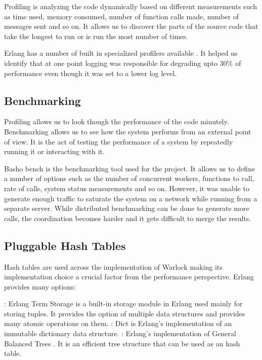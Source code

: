 Profiling is analyzing the code dynamically based on different measurements such
as  time used, memory consumed, number of function calls made,
number of messages
sent and so on. It allows us to discover the parts of the source code that take
the longest to run or is run the most number of times.

Erlang has a number of built in specialized profilers available
\citep{erlang.profiling}. It helped us identify that at one point logging was
responsible for degrading upto 30\% of performance even though it was set to a
lower log level.

\subsection{Benchmarking}

Profiling allows us to look though the performance of the code minutely.
Benchmarking allows us to see how the system performs from an external
point of view. It is the act of testing the performance of a system by
repeatedly running it or interacting with it.

Basho bench \citep{basho.bench} is the benchmarking tool used for the project.
It allows us to define a number of options such as the number of concurrent
workers, functions to call, rate of calls, system status measurements and so
on. However, it was unable to generate enough traffic to saturate the system
on a network while running from a separate server. While distributed
benchmarking can be done to generate more calls, the coordination becomes harder
and it gets difficult to merge the results.

\subsection{Pluggable Hash Tables}

Hash tables are used across the implementation of Warlock making its
implementation choice a crucial factor from the performance perspective.
Erlang provides many options:

\begin{itemize}
    : Erlang Term Storage is a built-in storage module in Erlang
    used mainly for storing tuples. It provides the option of multiple data
    structures and provides many atomic operations on them.
    : Dict is Erlang's implementation of an immutable dictionary
    data structure.
    : Erlang's implementation of General Balanced Trees
    \citep{Andersson99}. It is an efficient tree structure that can be used
    as an hash table.
\end{itemize}

